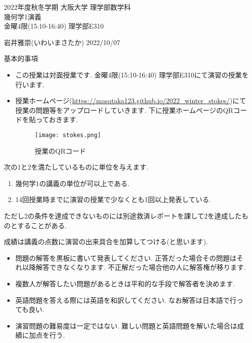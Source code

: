 \documentclass[dvipdfmx,a4paper,11pt]{article}
\theoremstyle{definition}
\begin{document}

\newpage
\begin{center}
{\Large 2022年度秋冬学期 大阪大学 理学部数学科 \\ 幾何学1演義} \\
金曜4限(15:10-16:40) 理学部E310
\end{center}
\begin{flushright}
 岩井雅崇(いわいまさたか) 2022/10/07 \\
\end{flushright}
{\large 基本的事項}
\begin{itemize}
  \setlength{\parskip}{0cm} %
  \setlength{\itemsep}{0cm} %
\item この授業は対面授業です. 金曜4限(15:10-16:40) 理学部E310にて演習の授業を行います.
\item 授業ホームページ(\url{https://masataka123.github.io/2022_winter_stokes/})にて授業の問題等をアップロードしていきます. 
下に授業ホームページのQRコードを貼っておきます. 
\begin{figure}[htbp]
\begin{center}
 \texttt{[image: stokes.png]}
 \caption*{授業のQRコード}
\end{center}
\end{figure}
\end{itemize}

\hspace{-18pt}{\large 成績に関して}

次の1と2を満たしているものに単位を与えます.
\begin{enumerate}
  \setlength{\parskip}{0cm} %
  \setlength{\itemsep}{0cm} %
\item 幾何学1の講義の単位が可以上である.
\item 14回授業時までに演習の授業で少なくとも1回以上発表している.
\end{enumerate}
ただし2の条件を達成できないものには別途救済レポートを課して2を達成したものとすることがある.

成績は講義の点数に演習の出来具合を加算してつける(と思います).

\vspace{11pt}
\hspace{-18pt}{\large 解答の仕方について}
\begin{itemize}
  \setlength{\parskip}{0cm} %
  \setlength{\itemsep}{0cm} %
  \item 問題の解答を黒板に書いて発表してください. 正答だった場合その問題はそれ以降解答できなくなります. 不正解だった場合他の人に解答権が移ります. 
  \item 複数人が解答したい問題があるときは平和的な手段で解答者を決めます. 
  \item 英語問題を答える際には英語を和訳してください. なお解答は日本語で行っても良い.
  \item 演習問題の難易度は一定ではない. 難しい問題と英語問題を解いた場合は成績に加点を行う. 
 \end{itemize}
\end{document}
